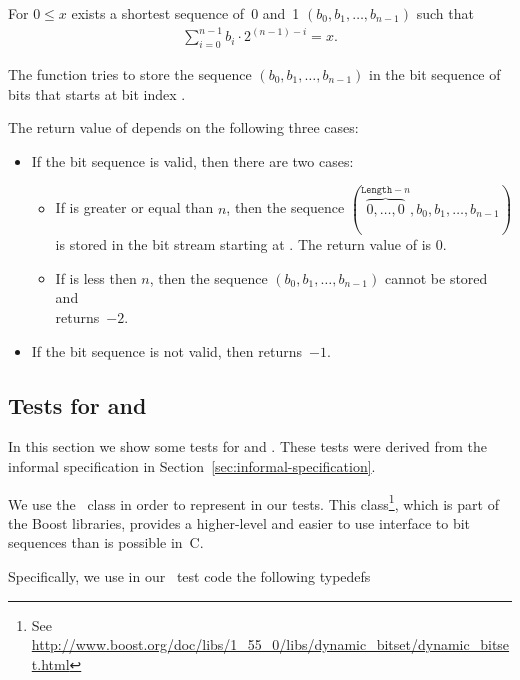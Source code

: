 For $0 \leq x$ exists a shortest sequence of~0 and~1
$(b_0, b_1,\ldots,b_{n - 1})$
such that
\begin{align}
    \sum_{i=0}^{n-1} b_i \cdot 2^{(n - 1) - i} = x.
\end{align}

The function \poke tries to store the sequence $(b_0, b_1,\ldots,b_{n - 1})$
in the bit sequence of  bits that starts
at bit index .

The return value of \poke depends on the following three cases:

\begin{itemize}
\item 
If the bit sequence is valid, then there are two cases:

\begin{itemize}
\item
If  is greater or equal than $n$, then  the sequence
$(\overbrace{0,\ldots,0}^{\mathtt{Length}-n},b_0, b_1,\ldots,b_{n - 1})$
is stored in the bit stream starting at .
The return value of \poke is 0.

\item
If   is less then $n$, then the
sequence $(b_0, b_1,\ldots,b_{n - 1})$ cannot be stored and\\
\poke returns~$-2$.
\end{itemize}

\item 
If the bit sequence is not valid, then \poke returns~$-1$.
\end{itemize}

\clearpage

\subsection{Tests for \peek and \poke}

In this section we show some tests for \peek and \poke.
These tests were derived from the informal specification in 
Section~\ref{sec:informal-specification}.

We use the \CC\ class  in order to represent
 in our tests.
This class\footnote{
  See \url{http://www.boost.org/doc/libs/1_55_0/libs/dynamic_bitset/dynamic_bitset.html}
},
which is part of the \textsf{Boost} libraries,
provides a higher-level and easier to use interface to bit sequences than is possible in~C.

Specifically, we use in our \CC\ test code the following typedefs

